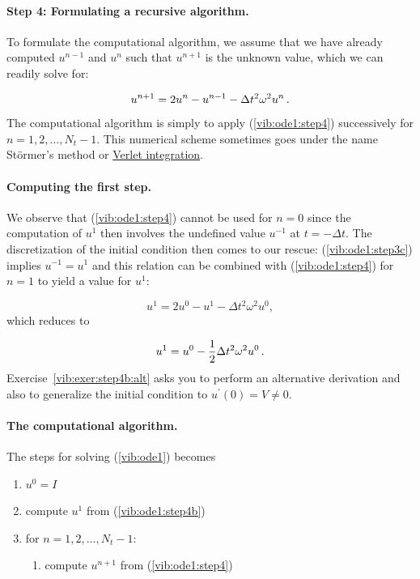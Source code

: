 \documentclass[%
oneside,                 %
final,                   %
10pt]{article}
\begin{document}
\paragraph{Step 4: Formulating a recursive algorithm.}
To formulate the computational algorithm, we assume that we
have already computed $u^{n-1}$ and $u^n$ such that $u^{n+1}$ is the
unknown value, which we can readily solve for:

\begin{equation}
u^{n+1} = 2u^n - u^{n-1} - \Delta t^2\omega^2 u^n
\tp
\label{vib:ode1:step4}
\end{equation}
The computational algorithm is simply to apply (\ref{vib:ode1:step4})
successively for $n=1,2,\ldots,N_t-1$. This numerical scheme sometimes
goes under the name
St\"{o}rmer's
method or \href{{http://en.wikipedia.org/wiki/Verlet_integration}}{Verlet integration}.

\paragraph{Computing the first step.}
We observe that (\ref{vib:ode1:step4}) cannot be used for $n=0$ since
the computation of $u^1$ then involves the undefined value $u^{-1}$
at $t=-\Delta t$. The discretization of the initial condition
then comes to our rescue: (\ref{vib:ode1:step3c}) implies $u^{-1} = u^1$
and this relation can be combined with (\ref{vib:ode1:step4})
for $n=1$ to yield a value for $u^1$:

\begin{equation*} u^1 = 2u^0 - u^{1} - \Delta t^2 \omega^2 u^0,\end{equation*}
which reduces to

\begin{equation}
u^1 = u^0 - \half \Delta t^2 \omega^2 u^0
\tp
\label{vib:ode1:step4b}
\end{equation}
Exercise~\ref{vib:exer:step4b:alt} asks you to perform an alternative derivation
and also to generalize the initial condition to $u^{\prime}(0)=V\neq 0$.

\paragraph{The computational algorithm.}
The steps for solving (\ref{vib:ode1}) becomes

\begin{enumerate}
 \item $u^0=I$

 \item compute $u^1$ from (\ref{vib:ode1:step4b})

 \item for $n=1,2,\ldots,N_t-1$:
\begin{enumerate}

   \item compute $u^{n+1}$ from (\ref{vib:ode1:step4})
\end{enumerate}

\noindent
\end{enumerate}
\end{document}
